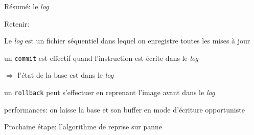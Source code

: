 \documentclass[aspectratio=169, handout]{beamer} %
\begin{document}
\begin{frame}{Résumé: le \textit{log}}

Retenir:

\vfill

\begin{redbullet}

  \item Le \textit{log} est un fichier séquentiel dans lequel
     on enregistre toutes les mises à jour
     
   \item un \texttt{commit} est effectif quand l'instruction est écrite dans le \textit{log}

        $\Rightarrow$ l'état de la base est dans le \textit{log}

   \item un \texttt{rollback} peut s'effectuer en reprenant l'image avant dans le \textit{log}
   
  \item performances: on laisse la base et son buffer en mode d'écriture opportuniste   

\end{redbullet}

\vfill

\begin{blocgauche}
Prochaine étape: l'algorithme de reprise sur panne
\end{blocgauche}
\vfill
{}

\end{frame}
\end{document}
